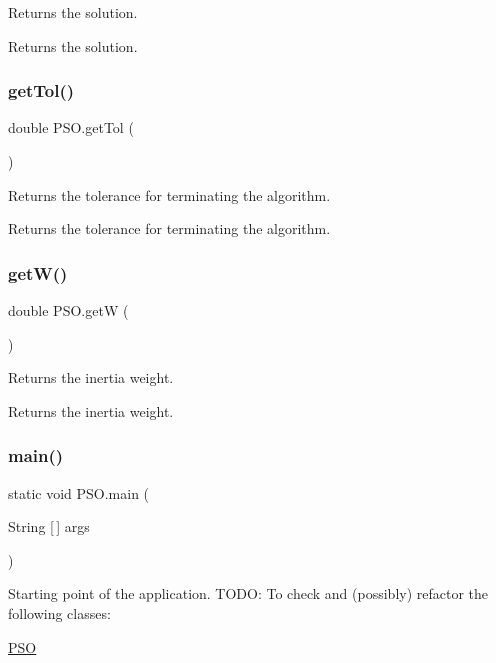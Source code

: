 Returns the solution. \begin{DoxyReturn}{Returns}
the solution. 
\end{DoxyReturn}
\mbox{\label{class_p_s_o_a57be39727a5a7e22182c82d4274ba3ae}} 
\subsubsection{\texorpdfstring{get\+Tol()}{getTol()}}
{\footnotesize\ttfamily double P\+S\+O.\+get\+Tol (\begin{DoxyParamCaption}{ }\end{DoxyParamCaption})}

Returns the tolerance for terminating the algorithm. \begin{DoxyReturn}{Returns}
the tolerance for terminating the algorithm. 
\end{DoxyReturn}
\mbox{\label{class_p_s_o_a50f5f8be53be944150317d590c411144}} 
\subsubsection{\texorpdfstring{get\+W()}{getW()}}
{\footnotesize\ttfamily double P\+S\+O.\+getW (\begin{DoxyParamCaption}{ }\end{DoxyParamCaption})}

Returns the inertia weight. \begin{DoxyReturn}{Returns}
the inertia weight. 
\end{DoxyReturn}
\mbox{\label{class_p_s_o_a966198c3d9ecb21acf593a5e922ba843}} 
\subsubsection{\texorpdfstring{main()}{main()}}
{\footnotesize\ttfamily static void P\+S\+O.\+main (\begin{DoxyParamCaption}\item[{String \mbox{[}$\,$\mbox{]}}]{args }\end{DoxyParamCaption})\hspace{0.3cm}{\ttfamily [static]}}

Starting point of the application. T\+O\+DO\+: To check and (possibly) refactor the following classes\+:
\begin{DoxyEnumerate}
\item \hyperlink{class_p_s_o}{P\+SO} 
\end{DoxyEnumerate}\mbox{\label{class_p_s_o_a83a2cd74d2176ea147b84e17050ceffb}} 
